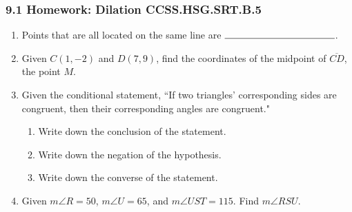 

\fancyhead[LE]{\thepage}



\subsubsection*{9.1 Homework: Dilation \hfill CCSS.HSG.SRT.B.5}
\begin{enumerate}
\item Points that are all located on the same line are $\rule{4cm}{0.15mm}$. \bigskip

\item Given $C(1,-2)$ and $D(7,9)$, find the coordinates of the midpoint of $\overline{CD}$, the point $M$.
  \vspace{4cm}

\item Given the conditional statement, ``If two triangles' corresponding sides are congruent, then their corresponding angles are congruent."
  \begin{enumerate}
    \item Write down the conclusion of the statement. \vspace{1.5cm}
    \item Write down the negation of the hypothesis. \vspace{1.5cm}
    \item Write down the converse of the statement. \vspace{2.5cm}
  \end{enumerate}

\item Given $m\angle R=50$, $m\angle U =65$, and $m\angle UST=115$. Find $m\angle RSU$.\\[1cm]
  \vspace{3cm}


\end{enumerate}
